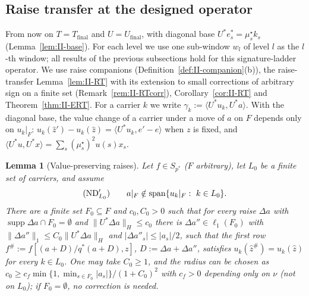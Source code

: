 \documentclass[10pt]{amsart}
\newtheorem{lemma}[theorem]{Lemma}
\theoremstyle{definition}
\theoremstyle{remark}
\newcommand{\supp}{\operatorname{supp}}
\newcommand{\spn}{\operatorname{span}}
\newcommand{\zh}{\hat z}
\newcommand{\ip}[2]{\langle #1,#2\rangle}
\begin{document}
\subsection{Raise transfer at the designed operator}\label{subsec:II-RS}

From now on $T=T_{\mathrm{final}}$ and $U=U_{\mathrm{final}}$, with diagonal
base $U^*e^*_s=\mu^\star_sk_s$ (Lemma~\ref{lem:II-base}).  For each level we
use one sub-window $w_l$ of level $l$ as the $l$-th window; all results of
the previous subsections hold for this signature-ladder operator.  We use
raise companions (Definition~\ref{def:II-companion}(b)), the raise-transfer
Lemma~\ref{lem:II-RT} with its extension to small corrections of arbitrary
sign on a finite set (Remark~\ref{rem:II-RTcorr}), Corollary~\ref{cor:II-RT}
and Theorem~\ref{thm:II-ERT}.  For a carrier $k$ we write $\gamma_k:=
\ip{U^*u_k}{U^*a}$.  With the diagonal base, the value change of a carrier
under a move of $a$ on $F$ depends only on $u_k|_F$:
$u_k(\zh')-u_k(\zh)=\ip{U^*u_k}{e'-e}$ when $z$ is fixed, and
$\ip{U^*u}{U^*x}=\sum_s(\mu^\star_s)^2u(s)x_s$.

\begin{lemma}[Value-preserving raises]\label{lem:II-VP}
Let $f\in S_{p^*}$ \textup{(}$F$ arbitrary\textup{)}, let $L_0$ be a finite set
of carriers, and assume
\[
 \textup{(ND$'_{L_0}$)}\qquad a|_F\notin\spn\{u_k|_F:\ k\in L_0\}.
\]
There are a finite set $F_0\subseteq F$ and $c_0,C_0>0$ such that for every
raise $\Delta a$ with $\supp\Delta a\cap F_0=\emptyset$ and $\|U^*\Delta a\|_H
\le c_0$ there is $\Delta a''\in\ell_1(F_0)$ with $\|\Delta a''\|_1\le C_0
\|U^*\Delta a\|_H$ and $|\Delta a''_s|\le|a_s|/2$, such that the first row
$f^\#:=f[(a+D)/q^*(a+D),z]$, $D:=\Delta a+\Delta a''$, satisfies
$u_k(\zh^\#)=u_k(\zh)$ for every $k\in L_0$.  One may take $C_0\ge1$, and
the radius can be chosen as $c_0\ge c_f\min\{1,\min_{s\in F_0}|a_s|\}/(1+
C_0)^2$ with $c_f>0$ depending only on $\nu$ (not on $L_0$); if $F_0=
\emptyset$, no correction is needed.
\end{lemma}
\end{document}

